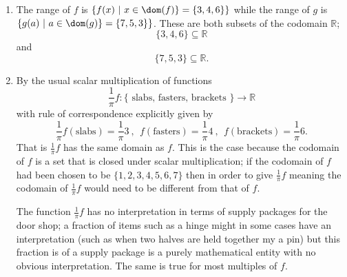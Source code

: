 \documentclass[12pt]{article}
\def\R{{\mathbb{R}}}
\begin{document}
\begin{enumerate}
\begin{enumerate}
The supply package $f$ can be modeled as the function that assigns to 
each type of supply item (slabs, fasters, and brackets) the number of items that come in that package. That is 
\[ f: \{ \text{ slabs, fasters, brackets } \} \to \mathbb{R}\]
with rule of correspondence explicitly given by
\[  f(\text{slabs})=3,f(\text{fasters})=4, f(\text{brackets})= 6.\]
Similarly
\[ g: \{ \text{ slabs, fasters, brackets } \} \to  \mathbb{R}\]
with rule of correspondence
\[  g(\text{slabs})=7,g(\text{fasters})=5, g(\text{brackets})= 3. \]

\item The range of $f$ is $\{ f(x)~|~x\in\dom(f)\}= \{3,4,6\} \}$
while the range of $g$ is $\{ g(a)~|~a\in \dom(g)\}= \{7,5,3\}\} $. These are both subsets of the codomain $\mathbb{R}$; 
\[ \{3,4,6\} \subseteq  \mathbb{R}\]
and
\[ \{7,5,3\} \subseteq  \R.\]

\item By the usual scalar multiplication of functions 
\[ \frac1\pi f: \{ \text{ slabs, fasters, brackets } \} \to \mathbb{R}\]
with rule of correspondence explicitly given by
\[  \frac1\pi f(\text{slabs})=\frac1\pi 3~,~~f(\text{fasters})=\frac1\pi 4~,~~ f(\text{brackets})= \frac1\pi 6.\] That is 
$\frac1\pi f$ has the same domain as $f$. This is the case because the codomain of $f$ is a set that is closed under scalar multiplication; if the codomain of $f$ had been chosen to be $\{1,2,3,4,5,6,7\}$ then in order to give $\frac1\pi f$ meaning the codomain of $\frac1\pi f$ would need to be different from that of $f$. 

The function $\frac1\pi f$ has no interpretation in terms of supply packages for the door shop; a fraction of items such as a hinge might in some cases have an interpretation (such as when two halves are held together my a pin) but this fraction is of a supply package is a purely mathematical entity with no obvious interpretation. The same is true for most multiples of $f$.



\end{enumerate}
\end{enumerate}
\end{document}
